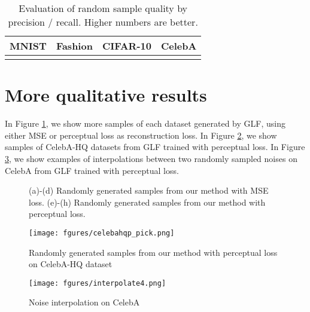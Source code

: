 \documentclass{article}
\begin{document}
\begin{table}[ht]
  \caption{ Evaluation of random sample quality by precision / recall. Higher numbers are better. }
  \label{prd}
  \centering
  \begin{tabular}{llll}
    \toprule
         MNIST  &Fashion & CIFAR-10 & CelebA \\
    \midrule
      
	  &   &   &   \\
    \bottomrule
  \end{tabular}
\end{table}

\section{More qualitative results}\label{AppC}
In Figure \ref{fig:more_sample_percept1}, we show more samples of each dataset generated by GLF, using either MSE or perceptual loss as reconstruction loss. In Figure \ref{fig:hq2}, we show samples of CelebA-HQ datasets from GLF trained with perceptual loss. In Figure \ref{fig:inter}, we show examples of interpolations between two randomly sampled noises on CelebA from GLF trained with perceptual loss. 

\begin{figure}[ht]
    \centering
    


  \centering
    \hfill
    \hfill
     \hfill
    
    \hfill
    
    \hfill
    \hfill
     \hfill
    \caption{\label{fig:more_sample_percept1}
    (a)-(d) Randomly generated samples from our method with MSE loss.
    (e)-(h) Randomly generated samples from our method with perceptual loss.}
\end{figure}


\clearpage

\begin{figure}
\centering
\texttt{[image: fgures/celebahqp\_pick.png]}
\caption{Randomly generated samples from our method with perceptual loss on CelebA-HQ dataset} \label{fig:hq2}
\end{figure}

\begin{figure}
\centering
\texttt{[image: fgures/interpolate4.png]}
\caption{Noise interpolation on CelebA} \label{fig:inter}
\end{figure}
\end{document}
